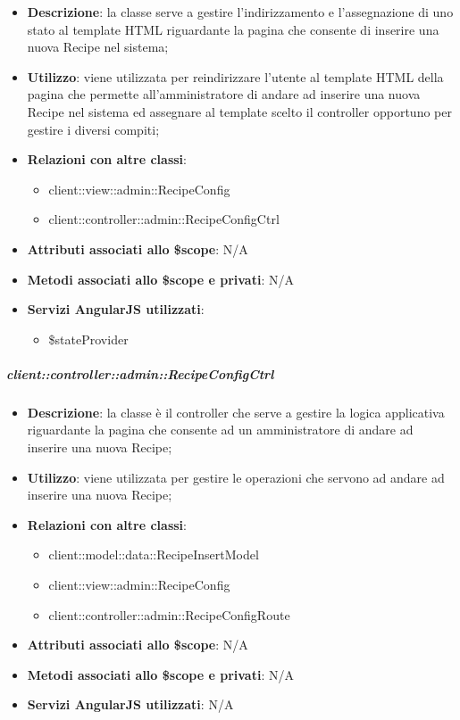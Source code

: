 			\begin{itemize}
				\item \textbf{Descrizione}: la classe serve a gestire l'indirizzamento e l'assegnazione di uno stato al template HTML riguardante la pagina che consente di inserire una nuova Recipe nel sistema;
				\item \textbf{Utilizzo}: viene utilizzata per reindirizzare l'utente al template HTML della pagina che permette all'amministratore di andare ad inserire una nuova Recipe nel sistema ed assegnare al template scelto il controller opportuno per gestire i diversi compiti;
				\item \textbf{Relazioni con altre classi}:
					\begin{itemize}
						\item client::view::admin::RecipeConfig
						\item client::controller::admin::RecipeConfigCtrl
					\end{itemize}
				\item \textbf{Attributi associati allo \$scope}: N/A
				\item \textbf{Metodi associati allo \$scope e privati}: N/A
				\item \textbf{Servizi AngularJS utilizzati}:
					\begin{itemize}
						\item \$stateProvider
					\end{itemize}
			\end{itemize}

		\subparagraph{client::controller::admin::RecipeConfigCtrl} %
		\label{subp:bdsm_app_client_controller_admin_recipeconfigctrl}
			\begin{itemize}
				\item \textbf{Descrizione}: la classe è il controller che serve a gestire la logica applicativa riguardante la pagina che consente ad un amministratore di andare ad inserire una nuova Recipe;
				\item \textbf{Utilizzo}: viene utilizzata per gestire le operazioni che servono ad andare ad inserire una nuova Recipe;
				\item \textbf{Relazioni con altre classi}:
					\begin{itemize}
						\item client::model::data::RecipeInsertModel
						\item client::view::admin::RecipeConfig
						\item client::controller::admin::RecipeConfigRoute
					\end{itemize}

				\item \textbf{Attributi associati allo \$scope}: N/A
				\item \textbf{Metodi associati allo \$scope e privati}: N/A
				\item \textbf{Servizi AngularJS utilizzati}: N/A

			\end{itemize}


